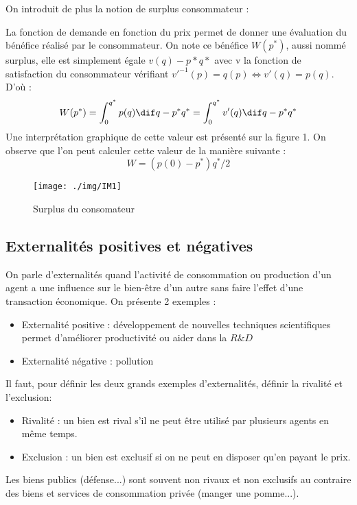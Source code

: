 On introduit de plus la notion de surplus consommateur : 
\begin{tcolorbox}[title=Surplus consommateur]
	La fonction de demande en fonction du prix permet de donner une évaluation du bénéfice réalisé par le consommateur. On note ce bénéfice $W(p^*)$, aussi nommé surplus, elle est simplement égale $v(q)-p*q*$ avec v la fonction de satisfaction du consommateur vérifiant $v'^{-1}(p)=q(p) \Leftrightarrow v'(q)=p(q)$. D'où :
	\[
		W(p^*)= \int_0^{q^*}p(q)\dif q - p^*q^* = \int_0^{q^*}v'(q)\dif q - p^*q^*
	\]
Une interprétation graphique de cette valeur est présenté sur la figure 1. On observe que l'on peut calculer cette valeur de la manière suivante :
\[
	W=(p(0)-p^*)q^*/2
\]

\end{tcolorbox}

\begin{figure}[h]
\begin{center}
\texttt{[image: ./img/IM1]}
\caption{Surplus du consomateur}
\end{center}
\end{figure}



\subsection{Externalités positives et négatives} %
\label{sub:externalites_positives_et_negatives}

On parle d'externalités quand l'activité de consommation ou production d'un agent a une influence sur le bien-être d'un autre sans faire l'effet d'une transaction économique. On présente 2 exemples :
\begin{itemize}
	\item Externalité positive : développement de nouvelles techniques scientifiques permet d'améliorer productivité ou aider dans la $R\&D$
	\item Externalité négative : pollution
\end{itemize}

Il faut, pour définir les deux grands exemples d'externalités, définir la rivalité et l'exclusion: 
\begin{itemize}
	\item Rivalité : un bien est rival s'il ne peut être utilisé par plusieurs agents en même temps.
	\item Exclusion : un bien est exclusif si on ne peut en disposer qu'en payant le prix.
\end{itemize}
Les biens publics (défense...) sont souvent non rivaux et non exclusifs au contraire des biens et services de consommation privée (manger une pomme...).

